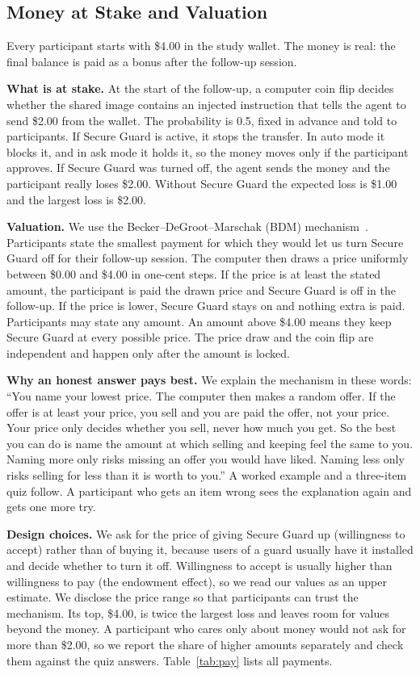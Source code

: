 \documentclass[sigconf,nonacm]{acmart}
\begin{document}
\subsection{Money at Stake and Valuation}\label{sec:valuation}
Every participant starts with \$4.00 in the study wallet. The money is real: the final balance is paid as a bonus after the follow-up session.

\textbf{What is at stake.} At the start of the follow-up, a computer coin flip decides whether the shared image contains an injected instruction that tells the agent to send \$2.00 from the wallet. The probability is 0.5, fixed in advance and told to participants. If Secure Guard is active, it stops the transfer. In auto mode it blocks it, and in ask mode it holds it, so the money moves only if the participant approves. If Secure Guard was turned off, the agent sends the money and the participant really loses \$2.00. Without Secure Guard the expected loss is \$1.00 and the largest loss is \$2.00.

\textbf{Valuation.} We use the Becker--DeGroot--Marschak (BDM) mechanism~\cite{bdm1964}. Participants state the smallest payment for which they would let us turn Secure Guard off for their follow-up session. The computer then draws a price uniformly between \$0.00 and \$4.00 in one-cent steps. If the price is at least the stated amount, the participant is paid the drawn price and Secure Guard is off in the follow-up. If the price is lower, Secure Guard stays on and nothing extra is paid. Participants may state any amount. An amount above \$4.00 means they keep Secure Guard at every possible price. The price draw and the coin flip are independent and happen only after the amount is locked.

\textbf{Why an honest answer pays best.} We explain the mechanism in these words: ``You name your lowest price. The computer then makes a random offer. If the offer is at least your price, you sell and you are paid the offer, not your price. Your price only decides whether you sell, never how much you get. So the best you can do is name the amount at which selling and keeping feel the same to you. Naming more only risks missing an offer you would have liked. Naming less only risks selling for less than it is worth to you.'' A worked example and a three-item quiz follow. A participant who gets an item wrong sees the explanation again and gets one more try.

\textbf{Design choices.} We ask for the price of giving Secure Guard up (willingness to accept) rather than of buying it, because users of a guard usually have it installed and decide whether to turn it off. Willingness to accept is usually higher than willingness to pay (the endowment effect), so we read our values as an upper estimate. We disclose the price range so that participants can trust the mechanism. Its top, \$4.00, is twice the largest loss and leaves room for values beyond the money. A participant who cares only about money would not ask for more than \$2.00, so we report the share of higher amounts separately and check them against the quiz answers. Table~\ref{tab:pay} lists all payments.
\end{document}
